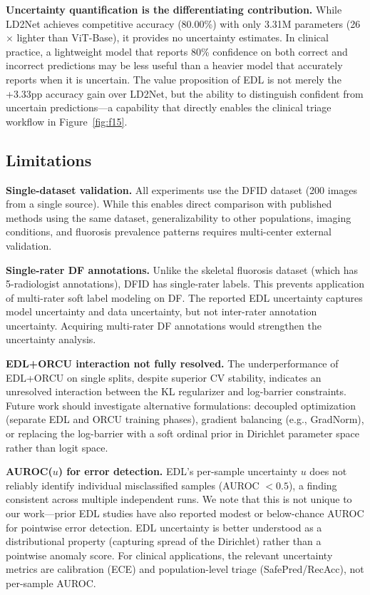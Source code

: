 \textbf{Uncertainty quantification is the differentiating contribution.} While LD2Net achieves competitive accuracy (80.00\%) with only 3.31M parameters (26$\times$ lighter than ViT-Base), it provides no uncertainty estimates. In clinical practice, a lightweight model that reports 80\% confidence on both correct and incorrect predictions may be less useful than a heavier model that accurately reports when it is uncertain. The value proposition of EDL is not merely the +3.33pp accuracy gain over LD2Net, but the ability to distinguish confident from uncertain predictions---a capability that directly enables the clinical triage workflow in Figure~\ref{fig:f15}.

\subsection{Limitations}

\textbf{Single-dataset validation.} All experiments use the DFID dataset (200 images from a single source). While this enables direct comparison with published methods using the same dataset, generalizability to other populations, imaging conditions, and fluorosis prevalence patterns requires multi-center external validation.

\textbf{Single-rater DF annotations.} Unlike the skeletal fluorosis dataset (which has 5-radiologist annotations), DFID has single-rater labels. This prevents application of multi-rater soft label modeling on DF. The reported EDL uncertainty captures model uncertainty and data uncertainty, but not inter-rater annotation uncertainty. Acquiring multi-rater DF annotations would strengthen the uncertainty analysis.

\textbf{EDL+ORCU interaction not fully resolved.} The underperformance of EDL+ORCU on single splits, despite superior CV stability, indicates an unresolved interaction between the KL regularizer and log-barrier constraints. Future work should investigate alternative formulations: decoupled optimization (separate EDL and ORCU training phases), gradient balancing (e.g., GradNorm), or replacing the log-barrier with a soft ordinal prior in Dirichlet parameter space rather than logit space.

\textbf{AUROC($u$) for error detection.} EDL's per-sample uncertainty $u$ does not reliably identify individual misclassified samples (AUROC $< 0.5$), a finding consistent across multiple independent runs. We note that this is not unique to our work---prior EDL studies have also reported modest or below-chance AUROC for pointwise error detection. EDL uncertainty is better understood as a distributional property (capturing spread of the Dirichlet) rather than a pointwise anomaly score. For clinical applications, the relevant uncertainty metrics are calibration (ECE) and population-level triage (SafePred/RecAcc), not per-sample AUROC.

